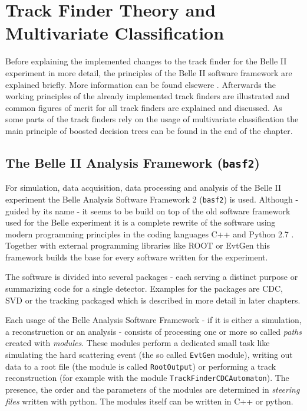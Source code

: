 \chapter{Track Finder Theory and Multivariate Classification}

Before explaining the implemented changes to the track finder for the Belle II experiment in more detail, the principles of the Belle II software framework are explained briefly. More information can be found elsewere \cite{tdr}. Afterwards the working principles of the already implemented track finders are illustrated and common figures of merit for all track finders are explained and discussed. As some parts of the track finders rely on the usage of multivariate classification the main principle of boosted decision trees can be found in the end of the chapter.

\section{The Belle II Analysis Framework (\texttt{basf2})}

For simulation, data acquisition, data processing and analysis of the Belle II experiment the Belle Analysis Software Framework 2 (\texttt{basf2}) is used. Although - guided by its name - it seems to be build on top of the old software framework used for the Belle experiment it is a complete rewrite of the software using modern programming principles in the coding languages C++ \cite{cpp} and Python 2.7 \cite{python}. Together with external programming libraries like ROOT \cite{root} or EvtGen \cite{evtgen} this framework builds the base for every software written for the experiment.

The software is divided into several packages - each serving a distinct purpose or summarizing code for a single detector. Examples for the packages are CDC, SVD or the tracking packaged which is described in more detail in later chapters.

Each usage of the Belle Analysis Software Framework - if it is either a simulation, a reconstruction or an analysis - consists of processing one or more so called \emph{paths} created with \emph{modules}. These modules perform a dedicated small task like simulating the hard scattering event (the so called \texttt{EvtGen} module), writing out data to a root file (the module is called \texttt{RootOutput}) or performing a track reconstruction (for example with the module \texttt{TrackFinderCDCAutomaton}). The presence, the order and the parameters of the modules are determined in \emph{steering files} written with python. The modules itself can be written in C++ or python. 

